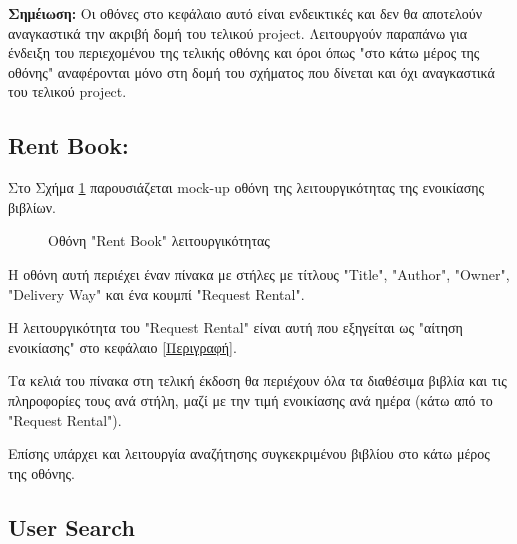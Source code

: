\documentclass[12pt,a4paper]{article}
\begin{document}
\textbf{Σημέιωση:} Οι οθόνες στο κεφάλαιο αυτό είναι ενδεικτικές και δεν θα αποτελούν αναγκαστικά την ακριβή δομή του τελικού project. Λειτουργούν παραπάνω για ένδειξη του περιεχομένου της τελικής οθόνης και όροι όπως "στο κάτω μέρος της οθόνης" αναφέρονται μόνο στη δομή του σχήματος που δίνεται και όχι αναγκαστικά του τελικού project.

\subsection{Rent Book:}

Στο Σχήμα \ref{Οθόνη "Rent Book" λειτουργικότητας} παρουσιάζεται mock-up οθόνη της λειτουργικότητας της ενοικίασης βιβλίων.

\begin{figure}[H]
	\caption{Οθόνη "Rent Book" λειτουργικότητας}
	\label{Οθόνη "Rent Book" λειτουργικότητας}
\end{figure}

Η οθόνη αυτή περιέχει έναν πίνακα με στήλες με τίτλους "Title", "Author", "Owner", "Delivery Way" και ένα κουμπί "Request Rental". 

Η λειτουργικότητα του "Request Rental" είναι αυτή που εξηγείται ως "αίτηση ενοικίασης" στο κεφάλαιο \ref{Περιγραφή}.

Τα κελιά του πίνακα στη τελική έκδοση θα περιέχουν όλα τα διαθέσιμα βιβλία και τις πληροφορίες τους ανά στήλη, μαζί με την τιμή ενοικίασης ανά ημέρα (κάτω από το "Request Rental").

Επίσης υπάρχει και λειτουργία αναζήτησης συγκεκριμένου βιβλίου στο κάτω μέρος της οθόνης.

\subsection{User Search}
\end{document}

